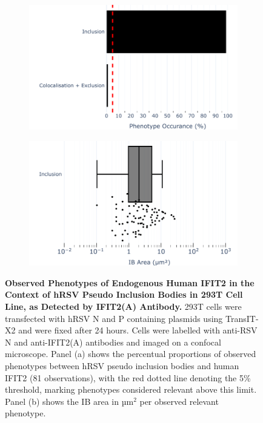 \begin{figure}
    \begin{subfigure}{0.495\textwidth}
        \caption{}
        \includegraphics[width=1\linewidth]{09. Chapter 4/Figs/01. pIB/03. IFIT2/02. IFIT2A/01. bar_i2a_293t.pdf}
    \end{subfigure}
    \begin{subfigure}{0.495\textwidth}
        \caption{}
        \includegraphics[width=1\linewidth]{09. Chapter 4/Figs/01. pIB/03. IFIT2/02. IFIT2A/02. box_i2a_293t.pdf}
    \end{subfigure}
    \caption[Observed Phenotypes of Endogenous Human IFIT2 in the Context of hRSV Pseudo Inclusion Bodies in 293T Cell Line, as Detected by IFIT2(A) Antibody.]{\textbf{Observed Phenotypes of Endogenous Human IFIT2 in the Context of hRSV Pseudo Inclusion Bodies in 293T Cell Line, as Detected by IFIT2(A) Antibody.} 293T cells were transfected with hRSV N and P containing plasmids using TransIT-X2 and were fixed after 24 hours. Cells were labelled with anti-RSV N and anti-IFIT2(A) antibodies and imaged on a confocal microscope. Panel (a) shows the percentual proportions of observed phenotypes between hRSV pseudo inclusion bodies and human IFIT2 (81 observations), with the red dotted line denoting the 5\% threshold, marking phenotypes considered relevant above this limit. Panel (b) shows the IB area in \(\mbox{µm}^2\) per observed relevant phenotype.}
    \label{fig:Observed Phenotypes of Endogenous Human IFIT2 in the Context of hRSV Pseudo Inclusion Bodies in 293T Cell Line, as Detected by IFIT2(A) Antibody}
\end{figure}

